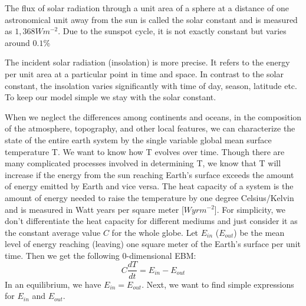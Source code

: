 \documentclass[%
thesis=student,%
coverpage=false,%
titlepage=false,%
headmarks=true, %
english,%
font=libertine, %
math=newpxtx, %
BCOR=5mm,%
coverBCOR=11mm%
]{tumbook}
\begin{document}
The flux of solar radiation through a unit area of a sphere at a distance of one astronomical unit away from the sun is called the solar constant and is measured as $1,368Wm^{-2}$. Due to the sunspot cycle, it is not exactly constant but varies around $0.1\%$

The incident solar radiation (insolation) is more precise. It refers to the energy per unit area at a particular point in time and space. In contrast to the solar constant, the insolation varies significantly with time of day, season, latitude etc. To keep our model simple we stay with the solar constant.

When we neglect the differences among continents and oceans, in the composition of the atmosphere, topography, and other local features, we can characterize the state of the entire earth system by the single variable global mean surface temperature T. We want to know how T evolves over time. Though there are many complicated processes involved in determining T, we know that T will increase if the energy from the sun reaching Earth's surface exceeds the amount of energy emitted by Earth and vice versa.
The heat capacity of a system is the amount of energy needed to raise the temperature by one degree Celsius/Kelvin and is measured in Watt years per square meter [$W yr m^{-2}$]. For simplicity, we don't differentiate the heat capacity for different mediums and just consider it as the constant average value $C$ for the whole globe.  Let $E_{in}$  ($E_{out}$) be the mean level of energy reaching (leaving) one square meter of the Earth's surface per unit time. Then we get the following 0-dimensional EBM: 
\begin{equation}
    C\frac{dT}{dt} = E_{in} - E_{out}
\end{equation}
In an equilibrium, we have $E_{in} = E_{out}$. Next, we want to find simple expressions for $E_{in}$ and $E_{out}$.
\end{document}
